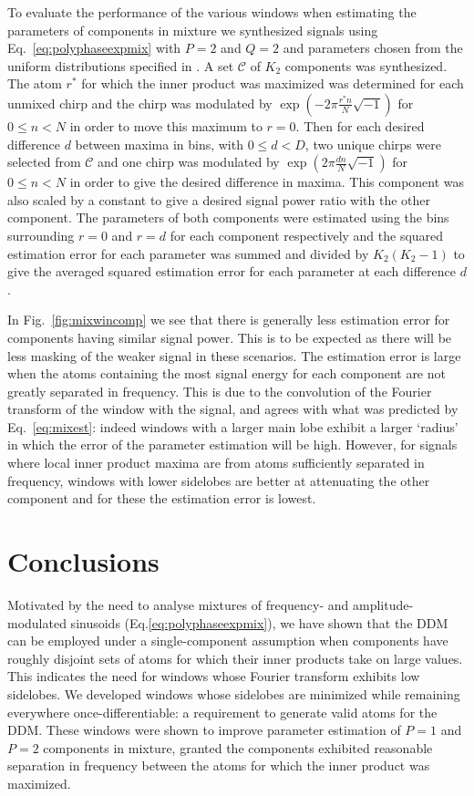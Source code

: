 \documentclass[twoside,a4paper]{article}
\begin{document}
To evaluate the performance of the various windows when estimating the
parameters of components in mixture we synthesized signals using
Eq.~\ref{eq:polyphaseexpmix} with $P=2$ and $Q=2$ and parameters chosen from the
uniform distributions specified in \cite{betser2009sinusoidal}. A set
$\mathcal{C}$ of $K_{2}$ components was synthesized. The atom $r^{\ast}$ for which
the inner product was maximized was determined for each unmixed chirp and the
chirp was modulated by $\exp(-2\pi \frac{r^{\ast} n}{N}\sqrt{-1})$ for $0 \leq n
< N$ in order to move this maximum to $r=0$. Then for each desired difference
$d$ between maxima in bins, with $0 \leq d < D$, two unique chirps were
selected from $\mathcal{C}$ and one chirp was modulated by $\exp(2\pi
\frac{d n}{N}\sqrt{-1})$ for $0 \leq n < N$ in order to give the desired difference in
maxima. This component was also scaled by a constant to give a desired signal
power ratio with the other component. The parameters of both components were
estimated using the bins surrounding $r=0$ and $r=d$ for each component
respectively and the squared estimation error for each parameter was summed and divided
by $K_{2}(K_{2}-1)$ to give the averaged squared estimation error for each
parameter at each difference $d$.

In Fig.~\ref{fig:mixwincomp} we see that there is generally less estimation
error for components having similar signal power. This is to be expected as
there will be less masking of the weaker signal in these scenarios.  The
estimation error is large when the atoms containing the most signal energy for
each component are not greatly separated in frequency. This is due to the
convolution of the Fourier transform of the window with the signal, and agrees
with what was predicted by Eq.~\ref{eq:mixest}: indeed windows with a larger
main lobe exhibit a larger `radius' in which the error of the parameter
estimation will be high.  However, for signals where local inner product maxima
are from atoms sufficiently separated in frequency, windows with lower sidelobes
are better at attenuating the other component and for these the estimation error
is lowest.

\section{Conclusions}

Motivated by the need to analyse mixtures of frequency- and
am\-pli\-tude-mod\-u\-lat\-ed
sinusoids (Eq.\ref{eq:polyphaseexpmix}), we have shown that the DDM can be
employed under a single-component
assumption when components have roughly disjoint sets of atoms for which their
inner products take on large values. This indicates the need for windows whose
Fourier transform exhibits low sidelobes. We developed windows whose sidelobes
are minimized while remaining everywhere once-differentiable: a requirement to
generate valid atoms for the DDM. These windows were shown to improve parameter
estimation of $P=1$ and $P=2$ components in mixture, granted the components
exhibited reasonable separation in frequency between the atoms for which the
inner product was maximized.
\end{document}
